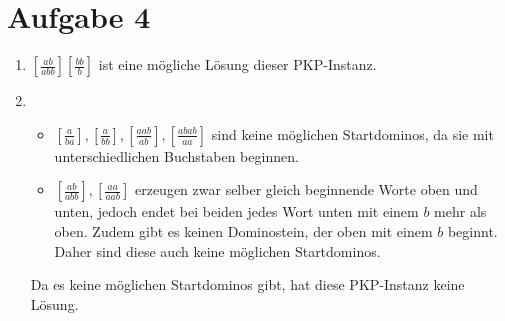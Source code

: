 \documentclass[a4paper,11pt]{scrartcl}
\begin{document}
	\section*{Aufgabe 4}
	\begin{enumerate}[label=\arabic*)]
	\item	$\left[ \frac{ab}{abb} \right] \left[ \frac{bb}{b} \right]$ ist eine mögliche Lösung dieser PKP-Instanz.
	
	\item	\begin{itemize}
			\item $\left[ \frac{a}{ba} \right], \left[ \frac{a}{bb} \right], \left[ \frac{aab}{ab} \right], \left[ \frac{abab}{aa} \right]$ sind keine möglichen Startdominos, da sie mit unterschiedlichen Buchstaben beginnen.
			\item $\left[ \frac{ab}{abb} \right], \left[ \frac{aa}{aab} \right]$ erzeugen zwar selber gleich beginnende Worte oben und unten, jedoch endet bei beiden jedes Wort unten mit einem $b$ mehr als oben. Zudem gibt es keinen Dominostein, der oben mit einem $b$ beginnt. Daher sind diese auch keine möglichen Startdominos.
			\end{itemize}
			Da es keine möglichen Startdominos gibt, hat diese PKP-Instanz keine Lösung.	
	\end{enumerate}
		
\end{document}
